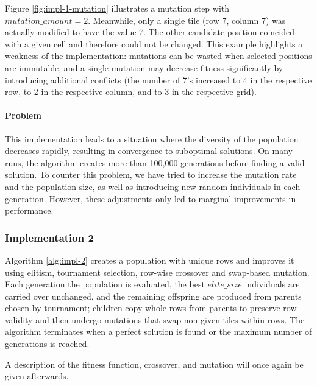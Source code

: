 Figure \ref{fig:impl-1-mutation} illustrates a mutation step with $mutation\_amount =2$. Meanwhile, only a single tile (row 7, column 7) was actually modified to have the value 7. The other candidate position coincided with a given cell and therefore could not be changed. This example highlights a weakness of the implementation: mutations can be wasted when selected positions are immutable, and a single mutation may decrease fitness significantly by introducing additional conflicts (the number of 7's increased to 4 in the respective row, to 2 in the respective column, and to 3 in the respective grid).

\paragraph{Problem}
This implementation leads to a situation where the diversity of the population decreases rapidly, resulting in convergence to suboptimal solutions. On many runs, the algorithm creates more than 100,000 generations before finding a valid solution.  
To counter this problem, we have tried to increase the mutation rate and the population size, as well as introducing new random individuals in each generation. However, these adjustments only led to marginal improvements in performance.

\subsubsection{Implementation 2}
Algorithm \ref{alg:impl-2} creates a population with unique rows and improves it using elitism, tournament selection, row-wise crossover and swap-based mutation. Each generation the population is evaluated, the best \(elite\_size\) individuals are carried over unchanged, and the remaining offspring are produced from parents chosen by tournament; children copy whole rows from parents to preserve row validity and then undergo mutations that swap non-given tiles within rows. The algorithm terminates when a perfect solution is found or the maximum number of generations is reached.

A description of the fitness function, crossover, and mutation will once again be given afterwards.

